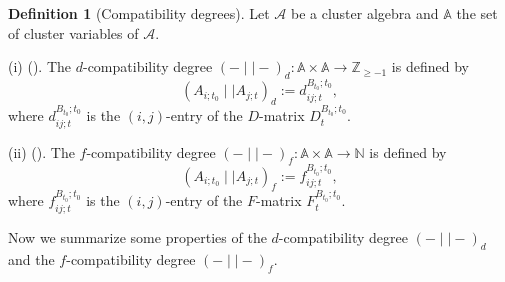 \documentclass{amsart}
\theoremstyle{definition}
\newtheorem{definition}[theorem]{Definition}
\theoremstyle{remark}
\numberwithin{equation}{section}
\begin{document}
\begin{definition}[Compatibility degrees]
Let $\mathcal A$ be a cluster algebra and $\mathbb A$  the set of cluster variables of $\mathcal A$.

(i) {\rm (}\cite[Definition 8]{CL1}{\rm ).} The $d$-compatibility degree $(-\mid\mid  -)_d: \mathbb A\times \mathbb A\rightarrow\mathbb Z_{\geq-1}$ is defined by
$$(A_{i;t_0}\mid\mid  A_{j;t})_d:=d_{ij;t}^{B_{t_0};t_0},$$
where  $d_{ij;t}^{B_{t_0};t_0}$ is the $(i,j)$-entry of the $D$-matrix $D_t^{B_{t_0};t_0}$.


(ii) {\rm (}\cite[Definition 4.9]{FG}{\rm ).} The $f$-compatibility degree $(-\mid\mid  -)_f: \mathbb A\times \mathbb A\rightarrow\mathbb N$ is defined by
$$(A_{i;t_0}\mid\mid  A_{j;t})_f:=f_{ij;t}^{B_{t_0};t_0},$$
where  $f_{ij;t}^{B_{t_0};t_0}$ is the $(i,j)$-entry of the $F$-matrix $F_t^{B_{t_0};t_0}$.
\end{definition}
Now we summarize some properties of the $d$-compatibility degree $(-\mid\mid  -)_d$ and the $f$-compatibility degree $(-\mid\mid  -)_f$. 
\end{document}
